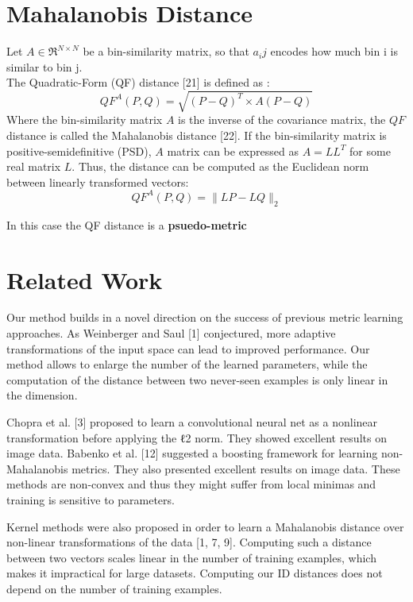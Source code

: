 \section{Mahalanobis Distance}
Let $A \in \Re^{N \times N}$ be a bin-similarity matrix, so that $a_ij$ encodes how much bin i is similar to bin j. \\
The Quadratic-Form (QF) distance [21] is defined as : 
\begin{equation}
QF^A(P, Q) = \sqrt{(P - Q)^T \times A(P - Q)}
\end{equation}
Where the bin-similarity matrix $A$ is the inverse of the covariance matrix, the $QF$ distance is called the Mahalanobis distance [22]. If the bin-similarity matrix is positive-semidefinitive (PSD), $A$ matrix can be expressed as $A = LL^T$ for some real matrix $L$. Thus, the distance can be computed as the Euclidean norm between linearly transformed vectors: 
\begin{equation}
QF^A(P, Q) = \lVert LP - LQ \rVert_2
\end{equation}


In this case the QF distance is a \textbf{psuedo-metric}


\section{Related Work}

Our method builds in a novel direction on the success of previous metric learning approaches. As Weinberger and Saul [1] conjectured, more adaptive transformations of the input space can lead to improved performance. Our method allows to enlarge the number of the learned parameters, while the computation of the distance between two never-seen examples is only linear in the dimension. 

Chopra et al. [3] proposed to learn a convolutional neural net as a nonlinear transformation before applying the ℓ2 norm. They showed excellent results on image data. 
Babenko et al. [12] suggested a boosting framework for learning non-Mahalanobis metrics. They also presented excellent results on image data. These methods are non-convex and thus they might suffer from local minimas and training is sensitive to parameters. 

Kernel methods were also proposed in order to learn a Mahalanobis distance over non-linear transformations of the data [1, 7, 9]. Computing such a distance between two vectors scales linear in the number of training examples, which makes it impractical for large datasets. Computing our ID distances does not depend on the number of training examples. 


